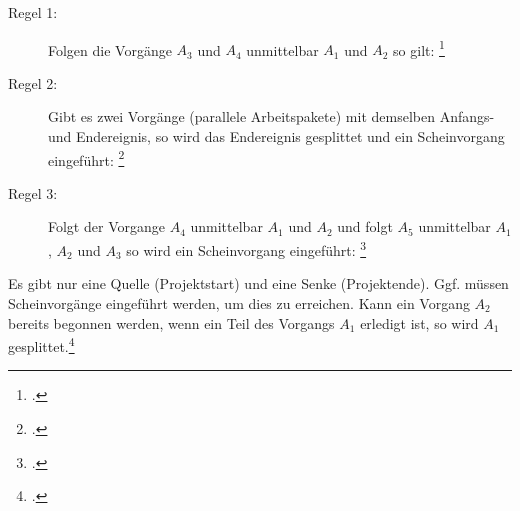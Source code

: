 \documentclass{bschlangaul-haupt}
\begin{document}
\begin{description}

\item[Regel 1:] Folgen die Vorgänge $A_3$ und $A_4$ unmittelbar $A_1$
und $A_2$ so gilt:
\footcite[Seite 24]{sosy:fs:3}

\begin{center}
\end{center}

\item[Regel 2:] Gibt es zwei Vorgänge (parallele Arbeitspakete) mit
demselben Anfangs- und Endereignis, so wird das Endereignis gesplittet
und ein Scheinvorgang eingeführt:
\footcite[Seite 25]{sosy:fs:3}

\begin{center}
\end{center}

\item[Regel 3:] Folgt der Vorgange $A_4$ unmittelbar $A_1$ und $A_2$ und
folgt $A_5$ unmittelbar $A_1$ , $A_2$ und $A_3$ so wird ein
Scheinvorgang eingeführt:
\footcite[Seite 26]{sosy:fs:3}
\end{description}

\begin{center}
\end{center}

\noindent
Es gibt nur eine Quelle (Projektstart) und eine Senke (Projektende).
Ggf. müssen Scheinvorgänge eingeführt werden, um dies zu erreichen.
%
Kann ein Vorgang $A_2$ bereits begonnen werden, wenn ein Teil des
Vorgangs $A_1$ erledigt ist, so wird $A_1$ gesplittet.\footcite[Seite
27]{sosy:fs:3}

\literatur
\end{document}
